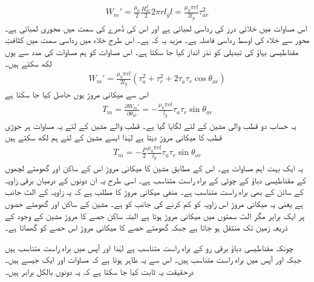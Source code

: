 \begin{align}
W_m'=\frac{\mu_0}{2} \frac{H_{ar}^2}{2} 2 \pi r l_g l=\frac{\mu_0 \pi r l}{2l_g} \tau_{ar}^2
\end{align}
اس مساوات میں خلائی درز کی رداسی لمبائی  ہے اور اس کی دُھرے کی سمت میں محوری لمبائی  ہے۔ محور سے خلاء کی اوسط رداسی فاصلہ  ہے۔ مزید یہ کہ  ہے۔ اس طرح خلاء میں رداسی سمت میں کثافتِ مقناطیسی بہاؤ کی تبدیلی کو نذر انداز کیا جا سکتا ہے۔ اس مساوات کو ہم مساوات  کی مدد سے یوں لکھ سکتے ہیں۔
\begin{align}
W_m'=\frac{\mu_0 \pi r l}{2 l_g} \left(\tau_a^2+\tau_r^2+2\tau_a \tau_r \cos \theta_{ar} \right) 
\end{align}
اس سے میکانی مروڑ یوں حاصل کیا جا سکتا ہے
\begin{align}
T_m=\frac{\partial W_m'}{\partial \theta_{ar}}=-\frac{\mu_0 \pi r l}{l_g} \tau_a \tau_r \sin \theta_{ar}
\end{align}
یہ حساب دو قطب والی مشین کے لئے لگایا گیا ہے۔ قطب والے مشین کے لئے یہ مساوات ہر جوڑی قطب کا میکانی مروڑ دیتا ہے لہٰذا ایسے مشین کے لئے ہم لکھ سکتے ہیں
\begin{align}
T_m=-\frac{P}{2}\frac{\mu_0 \pi r l}{l_g} \tau_a \tau_r \sin \theta_{ar}
\end{align}
یہ ایک بہت اہم مساوات ہے۔ اس کے مطابق مشین کا میکانی مروڑ اس کے ساکن اور گھومتے لچھوں کے مقناطیسی دباؤ کے چوٹی کے براہ راست متناسب ہے۔ اسی طرح یہ ان دونوں کے درمیان برقی زاویہ  کے سائن کے بھی براہ راست متناسب ہے۔ منفی میکانی مروڑ کا مطلب ہے کہ یہ زاویہ   کے الٹ جانب ہے یعنی یہ میکانی مروڑ اس زاویہ کو کم کرنے کی جانب کو ہے۔ مشین کے ساکن اور گھومتے حصوں پر ایک برابر مگر الٹ سمتوں میں میکانی مروڑ ہوتا ہے البتہ ساکن حصے کا مروڑ مشین کے وجود کے ذریعہ زمین تک منتقل ہو جاتا ہے جبکہ گھومتے حصے کا میکانی مروڑ اس حصے کو گھماتا ہے۔

چونکہ مقناطیسی دباؤ برقی رو کے براہ راست متناسب ہے لہٰذا   اور  آپس میں براہ راست متناسب ہیں جبکہ  اور  آپس میں براہ راست متناسب ہیں۔ اس سے یہ ظاہر ہوتا ہے کہ مساوات  اور  ایک جیسے ہیں۔ درحقیقت یہ ثابت کیا جا سکتا ہے کہ یہ دونوں بالکل برابر ہیں۔

